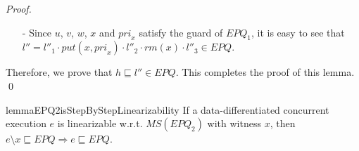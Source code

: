 \begin {proof}
\begin{itemize}
\item[-] Since $u$, $v$, $w$, $x$ and $\textit{pri}_x$ satisfy the guard of $\textit{EPQ}_1$, it is easy to see that $l'' = l''_1 \cdot \textit{put}(x,\textit{pri}_x) \cdot l''_2 \cdot \textit{rm}(x) \cdot l''_3 \in \textit{EPQ}$.
\end{itemize}

Therefore, we prove that $h \sqsubseteq l'' \in \textit{EPQ}$. This completes the proof of this lemma. \qed
\end {proof}


\begin{restatable}{lemma}{EPQ2isStepByStepLinearizability}
\label{lemma:EPQ2 is step-by-step linearizability}
If a data-differentiated concurrent execution $e$ is linearizable w.r.t. $\textit{MS}(\textit{EPQ}_2)$ with witness $x$, then $e \setminus x \sqsubseteq \textit{EPQ} \Rightarrow e \sqsubseteq \textit{EPQ}$.
\end{restatable}

